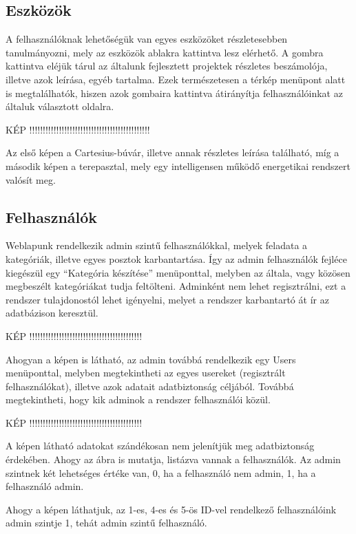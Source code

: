 \documentclass[
]{thesis-ekf}
\theoremstyle{definition}
\theoremstyle{remark}
\begin{document}
		\subsection{Eszközök}
			\par A felhasználóknak lehetőségük van egyes eszközöket részletesebben tanulmányozni, mely az eszközök ablakra kattintva lesz elérhető. A gombra kattintva eléjük tárul az általunk fejlesztett projektek részletes beszámolója, illetve azok leírása, egyéb tartalma. Ezek természetesen a térkép menüpont alatt is megtalálhatók, hiszen azok gombaira kattintva átirányítja felhasználóinkat az általuk választott oldalra.
			\par KÉP !!!!!!!!!!!!!!!!!!!!!!!!!!!!!!!!!!!!!!!!!!!!!
			\par Az első képen a Cartesius-búvár, illetve annak részletes leírása található, míg a második képen a terepasztal, mely egy intelligensen működő energetikai rendszert valósít meg.
			
		\subsection{Felhasználók}
			\par Weblapunk rendelkezik admin szintű felhasználókkal, melyek feladata a kategóriák, illetve egyes posztok karbantartása. Így az admin felhasználók fejléce kiegészül egy “Kategória készítése” menüponttal, melyben az általa, vagy közösen megbeszélt kategóriákat tudja feltölteni. Adminként nem lehet regisztrálni, ezt a rendszer tulajdonostól lehet igényelni, melyet a rendszer karbantartó át ír az adatbázison keresztül.
			\par KÉP !!!!!!!!!!!!!!!!!!!!!!!!!!!!!!!!!!!!!!!!!!
			\par Ahogyan a képen is látható, az admin továbbá rendelkezik egy Users menüponttal, melyben megtekintheti az egyes usereket (regisztrált felhasználókat), illetve azok adatait adatbiztonság céljából. Továbbá megtekintheti, hogy kik adminok a rendszer felhasználói közül.
			\par KÉP !!!!!!!!!!!!!!!!!!!!!!!!!!!!!!!!!!!!!!!!!!
			\par A képen látható adatokat szándékosan nem jelenítjük meg adatbiztonság érdekében. Ahogy az ábra is mutatja, listázva vannak a felhasználók. Az admin szintnek két lehetséges értéke van, 0, ha a felhasználó nem admin, 1, ha a felhasználó admin.
			\par Ahogy a képen láthatjuk, az 1-es, 4-es és 5-ös ID-vel rendelkező felhasználóink admin szintje 1, tehát admin szintű felhasználó.
\end{document}
